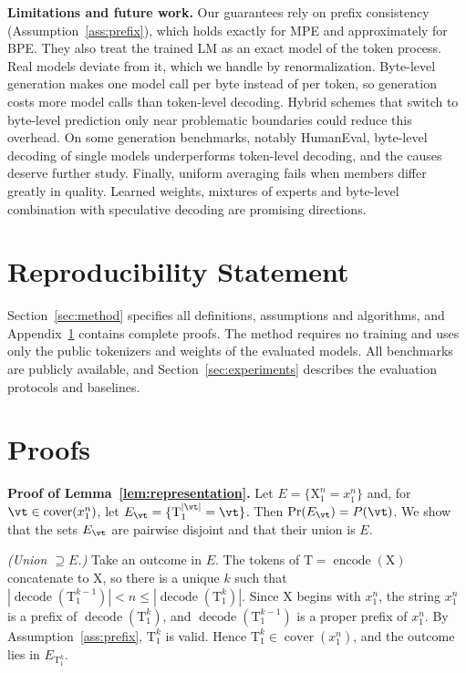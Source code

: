 \documentclass{article} %
\newcommand{\enc}{\operatorname{encode}}
\newcommand{\dec}{\operatorname{decode}}
\newcommand{\cover}{\operatorname{cover}}
\providecommand{\rX}{\mathrm{X}}
\providecommand{\rT}{\mathrm{T}}
\begin{document}
\textbf{Limitations and future work.} Our guarantees rely on prefix consistency (Assumption~\ref{ass:prefix}), which holds exactly for MPE and approximately for BPE. They also treat the trained LM as an exact model of the token process. Real models deviate from it, which we handle by renormalization. Byte-level generation makes one model call per byte instead of per token, so generation costs more model calls than token-level decoding. Hybrid schemes that switch to byte-level prediction only near problematic boundaries could reduce this overhead. On some generation benchmarks, notably HumanEval, byte-level decoding of single models underperforms token-level decoding, and the causes deserve further study. Finally, uniform averaging fails when members differ greatly in quality. Learned weights, mixtures of experts and byte-level combination with speculative decoding are promising directions.

\section*{Reproducibility Statement}
Section~\ref{sec:method} specifies all definitions, assumptions and algorithms, and Appendix~\ref{app:proofs} contains complete proofs. The method requires no training and uses only the public tokenizers and weights of the evaluated models. All benchmarks are publicly available, and Section~\ref{sec:experiments} describes the evaluation protocols and baselines.




\appendix
\section{Proofs}
\label{app:proofs}

\textbf{Proof of Lemma~\ref{lem:representation}.}
Let $E = \{\rX_1^n = x_1^n\}$ and, for $\vt \in \cover(x_1^n)$, let $E_{\vt} = \{\rT_1^{|\vt|} = \vt\}$. Then $\Pr(E_{\vt}) = P(\vt)$. We show that the sets $E_{\vt}$ are pairwise disjoint and that their union is $E$.

\emph{(Union $\supseteq E$.)} Take an outcome in $E$. The tokens of $\rT = \enc(\rX)$ concatenate to $\rX$, so there is a unique $k$ such that $|\dec(\rT_1^{k-1})| < n \le |\dec(\rT_1^{k})|$. Since $\rX$ begins with $x_1^n$, the string $x_1^n$ is a prefix of $\dec(\rT_1^k)$, and $\dec(\rT_1^{k-1})$ is a proper prefix of $x_1^n$. By Assumption~\ref{ass:prefix}, $\rT_1^k$ is valid. Hence $\rT_1^k \in \cover(x_1^n)$, and the outcome lies in $E_{\rT_1^k}$.
\end{document}
